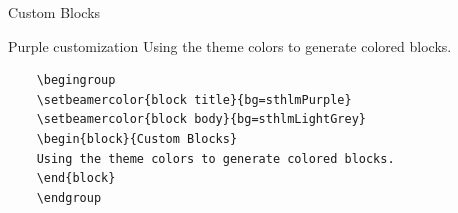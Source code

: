 \documentclass[compress]{beamer}
\begin{document}

\begin{frame}[containsverbatim]{Custom Blocks}
	\begingroup
	\begin{block}{Purple customization}
		Using the theme colors to generate colored blocks.
	\end{block}
	\endgroup
	\begin{lstlisting}
	\begingroup
	\setbeamercolor{block title}{bg=sthlmPurple}
	\setbeamercolor{block body}{bg=sthlmLightGrey}
	\begin{block}{Custom Blocks}
	Using the theme colors to generate colored blocks.
	\end{block}
	\endgroup
	\end{lstlisting}
\end{frame}
\end{document}
